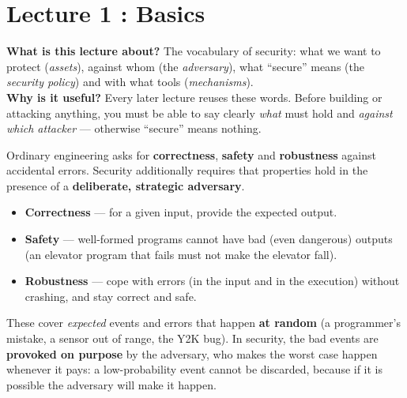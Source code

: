 \chapter{Lecture 1 : Basics}

\begin{rembox}[title=In a nutshell]
\textbf{What is this lecture about?} The vocabulary of security: what we want to protect
(\emph{assets}), against whom (the \emph{adversary}), what ``secure'' means (the
\emph{security policy}) and with what tools (\emph{mechanisms}). \\
\textbf{Why is it useful?} Every later lecture reuses these words. Before building or
attacking anything, you must be able to say clearly \emph{what} must hold and
\emph{against which attacker} --- otherwise ``secure'' means nothing.
\end{rembox}

\begin{rembox}[title=Why a course on security?]
Ordinary engineering asks for \textbf{correctness}, \textbf{safety} and
\textbf{robustness} against accidental errors. Security additionally requires that
properties hold in the presence of a \textbf{deliberate, strategic adversary}.
\end{rembox}

\begin{defnbox}[title={Correctness, safety, robustness (what we usually ask)}]
\begin{itemize}
  \item \textbf{Correctness} --- for a given input, provide the expected output.
  \item \textbf{Safety} --- well-formed programs cannot have bad (even dangerous) outputs (an
        elevator program that fails must not make the elevator fall).
  \item \textbf{Robustness} --- cope with errors (in the input and in the execution) without
        crashing, and stay correct and safe.
\end{itemize}
These cover \emph{expected} events and errors that happen \textbf{at random} (a programmer's
mistake, a sensor out of range, the Y2K bug). In security, the bad events are \textbf{provoked on
purpose} by the adversary, who makes the worst case happen whenever it pays: a low-probability
event cannot be discarded, because if it is possible the adversary will make it happen.
\end{defnbox}

